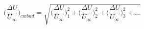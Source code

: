 \documentclass[12pt]{article}
\begin{document}
    \begin{equation}
    \label{Eq:CmbndWake}
        \bigg(\frac{\Delta U}{U_{\infty}}\bigg)_{cmbnd} = 
            \sqrt{
                \bigg(\frac{\Delta U}{U_{\infty}}\bigg)_{1}^{2} +
                \bigg(\frac{\Delta U}{U_{\infty}}\bigg)_{2}^{2} +
                \bigg(\frac{\Delta U}{U_{\infty}}\bigg)_{3}^{2} +
                \dots}
    \end{equation}



\end{document}
